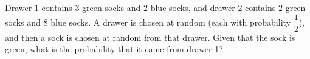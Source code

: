 Drawer 1 contains $3$ green socks and $2$ blue socks, and drawer 2 contains $2$ green socks and $8$ blue socks. A drawer is chosen at random (each with probability $\dfrac12$), and then a sock is chosen at random from that drawer. Given that the sock is green, what is the probability that it came from drawer 1?

